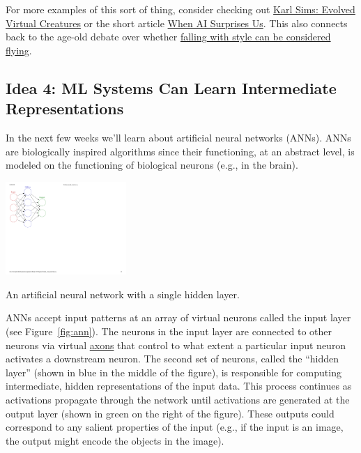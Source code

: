 \documentclass[assignment01_Solutions]{subfiles}
\begin{document}
For more examples of this sort of thing, consider checking out \href{https://www.youtube.com/watch?v=bBt0imn77Zg}{Karl Sims: Evolved Virtual Creatures} or the short article \href{https://aiweirdness.com/post/172894792687/when-algorithms-surprise-us}{When AI Surprises Us}.  This also connects back to the age-old debate over whether \href{https://www.youtube.com/watch?v=8M_1GAX3WcI}{falling with style can be considered flying}.


\subsection*{Idea 4: ML Systems Can Learn Intermediate Representations}

In the next few weeks we'll learn about artificial neural networks (ANNs).  ANNs are biologically inspired algorithms since their functioning, at an abstract level, is modeled on the functioning of biological neurons (e.g., in the brain).

\begin{marginfigure}
\includegraphics[width=1.8in]{figures/Colored_neural_network}
\caption{An artificial neural network with a single hidden layer.}\label{fig:ann}
\end{marginfigure}
ANNs accept input patterns at an array of virtual neurons called the input layer (see Figure~\ref{fig:ann}).  The neurons in the input layer are connected to other neurons via virtual \href{https://en.wikipedia.org/wiki/Axon}{axons} that control to what extent a particular input neuron activates a downstream neuron.  The second set of neurons, called the ``hidden layer'' (shown in blue in the middle of the figure), is responsible for computing intermediate, hidden representations of the input data.  This process continues as activations propagate through the network until activations are generated at the output layer (shown in green on the right of the figure). These outputs could correspond to any salient properties of the input (e.g., if the input is an image, the output might encode the objects in the image).
\end{document}
